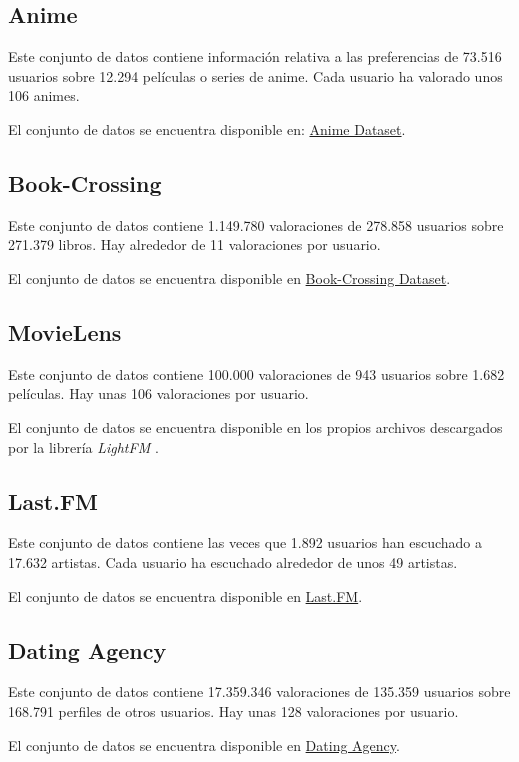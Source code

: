 \subsection{Anime}\label{anime}
Este conjunto de datos \cite{CopperUnion2017} contiene información relativa a las preferencias de 73.516 usuarios sobre 12.294 películas o series de anime. Cada usuario ha valorado unos 106 animes.

El conjunto de datos se encuentra disponible en: \href{https://www.kaggle.com/CooperUnion/anime-recommendations-database/downloads/anime-recommendations-database.zip/1}{Anime Dataset}.

\subsection{Book-Crossing}\label{book-crossing}
Este conjunto de datos \cite{Ziegler2004} contiene 1.149.780 valoraciones de 278.858 usuarios sobre 271.379 libros. Hay alrededor de 11 valoraciones por usuario.

El conjunto de datos se encuentra disponible en \href{http://www2.informatik.uni-freiburg.de/~cziegler/BX/BX-CSV-Dump.zip}{Book-Crossing Dataset}.

\subsection{MovieLens}\label{movielens}
Este conjunto de datos \cite{GroupLens1998} contiene 100.000 valoraciones de 943 usuarios sobre 1.682 películas. Hay unas 106 valoraciones por usuario.

El conjunto de datos se encuentra disponible en los propios archivos descargados por la librería \textit{LightFM} \cite{DBLP:conf/recsys/Kula15}.

\subsection{Last.FM}\label{last.fm}
Este conjunto de datos \cite{Cantador:RecSys2011} contiene las veces que 1.892 usuarios han escuchado a 17.632 artistas. Cada usuario ha escuchado alrededor de unos 49 artistas.

El conjunto de datos se encuentra disponible en \href{http://files.grouplens.org/datasets/hetrec2011/hetrec2011-lastfm-2k.zip}{Last.FM}.

\subsection{Dating Agency}\label{dating-agency}
Este conjunto de datos \cite{brozovsky07recommender} contiene 17.359.346 valoraciones de 135.359 usuarios sobre 168.791 perfiles de otros usuarios. Hay unas 128 valoraciones por usuario.

El conjunto de datos se encuentra disponible en \href{http://www.occamslab.com/petricek/data/libimseti-complete.zip}{Dating Agency}.